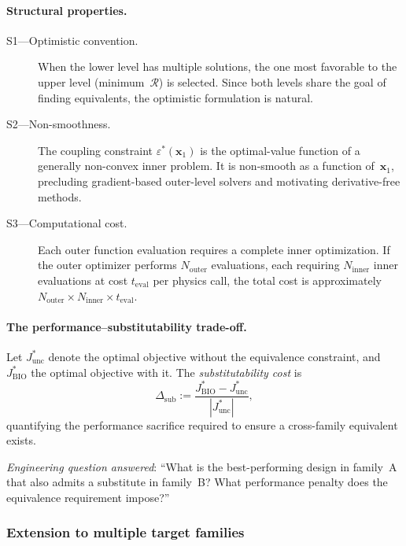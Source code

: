 \paragraph{Structural properties.}

\begin{description}
    \item[S1---Optimistic convention.] When the lower level has multiple solutions, the one most favorable to the upper level (minimum~$\mathcal{R}$) is selected. Since both levels share the goal of finding equivalents, the optimistic formulation is natural.
    \item[S2---Non-smoothness.] The coupling constraint $\varepsilon^*(\mathbf{x}_1)$ is the optimal-value function of a generally non-convex inner problem. It is non-smooth as a function of~$\mathbf{x}_1$, precluding gradient-based outer-level solvers and motivating derivative-free methods.
    \item[S3---Computational cost.] Each outer function evaluation requires a complete inner optimization. If the outer optimizer performs $N_{\mathrm{outer}}$ evaluations, each requiring $N_{\mathrm{inner}}$ inner evaluations at cost $t_{\mathrm{eval}}$ per physics call, the total cost is approximately $N_{\mathrm{outer}} \times N_{\mathrm{inner}} \times t_{\mathrm{eval}}$.
\end{description}

\paragraph{The performance--substitutability trade-off.}
Let $J_{\mathrm{unc}}^*$ denote the optimal objective without the equivalence constraint, and $J_{\mathrm{BIO}}^*$ the optimal objective with it. The \emph{substitutability cost} is
\begin{equation}
    \Delta_{\mathrm{sub}}
    := \frac{J_{\mathrm{BIO}}^* - J_{\mathrm{unc}}^*}{|J_{\mathrm{unc}}^*|},
    \label{eq:sub_cost}
\end{equation}
quantifying the performance sacrifice required to ensure a cross-family equivalent exists.

\medskip
\noindent\emph{Engineering question answered}: ``What is the best-performing design in family~A that also admits a substitute in family~B? What performance penalty does the equivalence requirement impose?''


\subsubsection{Extension to multiple target families}
\label{sec:multiple_families}

